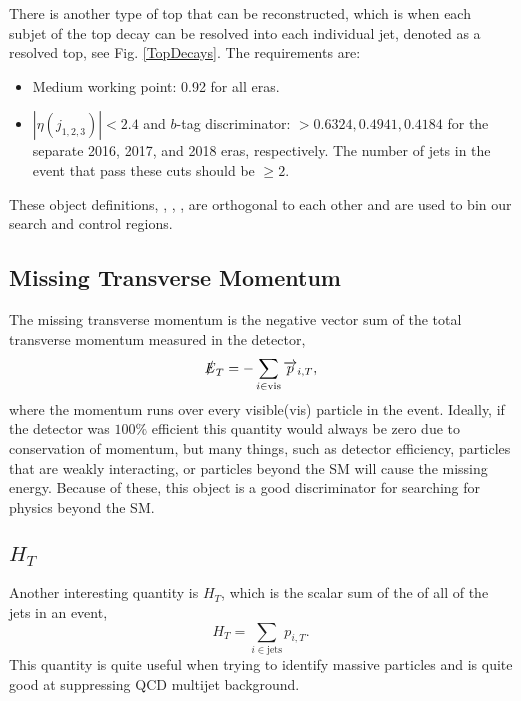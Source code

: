 There is another type of top that can be reconstructed, which is when each subjet of the top decay can be resolved into each individual jet, denoted as a resolved top, see Fig. \ref{TopDecays}. The requirements are:
\begin{itemize}
	\item Medium working point: 0.92 for all eras.
	\item $|\eta(j_{1,2,3})|<2.4$ and $b$-tag discriminator: $>0.6324, 0.4941, 0.4184$ for the separate 2016, 2017, and 2018 eras, respectively. The number of jets in the event that pass these cuts should be $\geq2$.
\end{itemize}
These object definitions, \nt, \nw, \nrt, are orthogonal to each other and are used to bin our search and control regions. 

\subsection{Missing Transverse Momentum}\label{MET}
The missing transverse momentum is the negative vector sum of the total transverse momentum measured in the detector,
\begin{equation}
\slashed{E}_{T}=-\sum_{i\in\text{vis}}\overrightarrow{p}_{i, T},
\end{equation}
where the momentum runs over every visible(vis) particle in the event. Ideally, if the detector was $100\%$ efficient this quantity would always be zero due to conservation of momentum, but many things, such as detector efficiency, particles that are weakly interacting, or particles beyond the SM will cause the missing energy. Because of these, this object is a good discriminator for searching for physics beyond the SM. 


\subsection{$H_T$}\label{HT}
Another interesting quantity is $H_T$, which is the scalar sum of the \pt{} of all of the jets in an event,
\begin{equation}
H_T=\sum_{i\in\text{jets}}p_{i,T}.
\end{equation}
This quantity is quite useful when trying to identify massive particles and is quite good at suppressing QCD multijet background.

